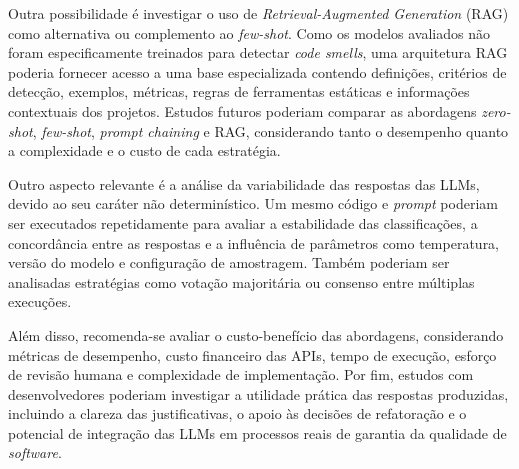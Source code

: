 Outra possibilidade é investigar o uso de \textit{Retrieval-Augmented Generation} (RAG) como alternativa ou complemento ao \textit{few-shot}. Como os modelos avaliados não foram especificamente treinados para detectar \textit{code smells}, uma arquitetura RAG poderia fornecer acesso a uma base especializada contendo definições, critérios de detecção, exemplos, métricas, regras de ferramentas estáticas e informações contextuais dos projetos. Estudos futuros poderiam comparar as abordagens \textit{zero-shot}, \textit{few-shot}, \textit{prompt chaining} e RAG, considerando tanto o desempenho quanto a complexidade e o custo de cada estratégia.

Outro aspecto relevante é a análise da variabilidade das respostas das LLMs, devido ao seu caráter não determinístico. Um mesmo código e \textit{prompt} poderiam ser executados repetidamente para avaliar a estabilidade das classificações, a concordância entre as respostas e a influência de parâmetros como temperatura, versão do modelo e configuração de amostragem. Também poderiam ser analisadas estratégias como votação majoritária ou consenso entre múltiplas execuções.

Além disso, recomenda-se avaliar o custo-benefício das abordagens, considerando métricas de desempenho, custo financeiro das APIs, tempo de execução, esforço de revisão humana e complexidade de implementação. Por fim, estudos com desenvolvedores poderiam investigar a utilidade prática das respostas produzidas, incluindo a clareza das justificativas, o apoio às decisões de refatoração e o potencial de integração das LLMs em processos reais de garantia da qualidade de \textit{software}.


